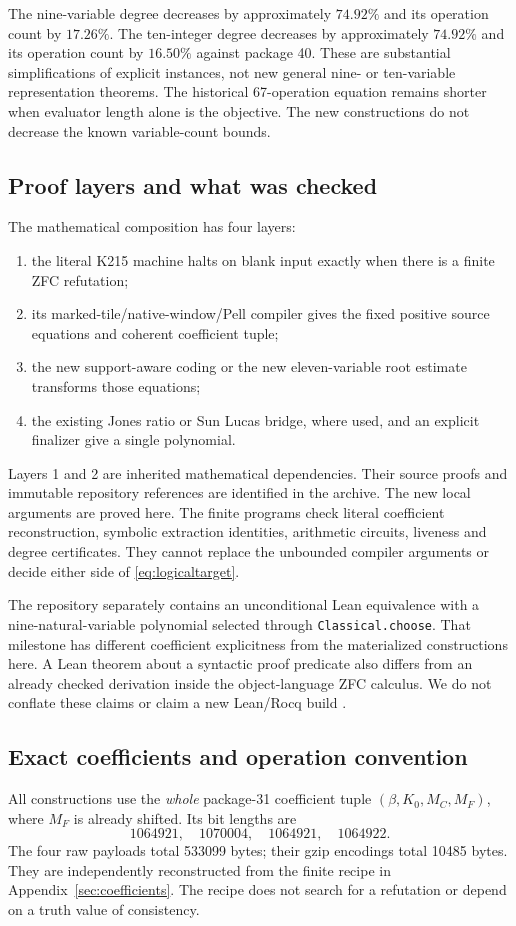 \documentclass[11pt]{article}
\theoremstyle{remark}\newtheorem{remark}[theorem]{Remark}
\begin{document}
The nine-variable degree decreases by approximately $74.92\%$ and its
operation count by $17.26\%$. The ten-integer degree decreases by
approximately $74.92\%$ and its operation count by $16.50\%$ against
package 40. These are substantial simplifications of explicit instances,
not new general nine- or ten-variable representation theorems. The
historical 67-operation equation remains shorter when evaluator length
alone is the objective. The new constructions do not decrease the
known variable-count bounds.

\subsection{Proof layers and what was checked}
The mathematical composition has four layers:
\begin{enumerate}[leftmargin=*]
\item the literal K215 machine halts on blank input exactly when there is
 a finite ZFC refutation;
\item its marked-tile/native-window/Pell compiler gives the fixed positive
 source equations and coherent coefficient tuple;
\item the new support-aware coding or the new eleven-variable root
 estimate transforms those equations;
\item the existing Jones ratio or Sun Lucas bridge, where used, and an
 explicit finalizer give a single polynomial.
\end{enumerate}
Layers 1 and 2 are inherited mathematical dependencies. Their source
proofs and immutable repository references are identified in the archive.
The new local arguments are proved here. The finite programs check
literal coefficient reconstruction, symbolic extraction identities,
arithmetic circuits, liveness and degree certificates. They cannot replace
the unbounded compiler arguments or decide either side of
\eqref{eq:logicaltarget}.

The repository separately contains an unconditional Lean equivalence with
a nine-natural-variable polynomial selected through
\texttt{Classical.choose}. That milestone has different coefficient
explicitness from the materialized constructions here. A Lean theorem
about a syntactic proof predicate also differs from an already checked
derivation inside the object-language ZFC calculus. We do not conflate
these claims or claim a new Lean/Rocq build \cite{active}.

\subsection{Exact coefficients and operation convention}
All constructions use the \emph{whole} package-31 coefficient tuple
$(\beta,K_0,M_C,M_F)$, where $M_F$ is already shifted. Its bit lengths are
\[
1064921,\quad1070004,\quad1064921,\quad1064922.
\]
The four raw payloads total 533099 bytes; their gzip encodings total
10485 bytes. They are independently reconstructed from the finite recipe
in Appendix~\ref{sec:coefficients}. The recipe does not search for a
refutation or depend on a truth value of consistency.
\end{document}
